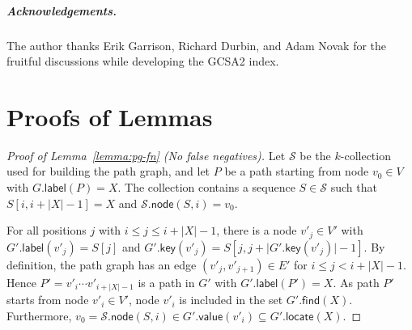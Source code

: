 \documentclass[a4paper,UKenglish]{lipics-v2016}
\newcommand{\abs}[1]{\ensuremath{\lvert #1 \rvert}}
\newcommand{\find}{\ensuremath{\mathsf{find}}}
\newcommand{\locate}{\ensuremath{\mathsf{locate}}}
\newcommand{\glabel}{\ensuremath{\mathsf{label}}}
\newcommand{\gkey}{\ensuremath{\mathsf{key}}}
\newcommand{\gvalue}{\ensuremath{\mathsf{value}}}
\newcommand{\gnode}{\ensuremath{\mathsf{node}}}
\newcommand{\kcollection}[1]{$#1$\nobreakdash-collection}
\begin{document}
\subparagraph*{Acknowledgements.}

The author thanks Erik Garrison, Richard Durbin, and Adam Novak for the fruitful discussions while developing the GCSA2 index.





\clearpage
\appendix
\section{Proofs of Lemmas}\label{appendix:proofs}

\begin{proof}[Proof of Lemma~\ref{lemma:pg-fn} (No false negatives)]
Let $\mathcal{S}$ be the \kcollection{k} used for building the path graph, and let $P$ be a path starting from node $v_{0} \in V$ with $G.\glabel(P) = X$. The collection contains a sequence $S \in \mathcal{S}$ such that $S[i, i+\abs{X}-1] = X$ and $\mathcal{S}.\gnode(S, i) = v_{0}$.

For all positions $j$ with $i \le j \le i+\abs{X}-1$, there is a node $v'_{j} \in V'$ with $G'.\glabel(v'_{j}) = S[j]$ and $G'.\gkey(v'_{j}) = S[j, j+\abs{G'.\gkey(v'_{j})}-1]$.
By definition, the path graph has an edge $(v'_{j}, v'_{j+1}) \in E'$ for $i \le j < i+\abs{X}-1$.
Hence $P' = v'_{i} \dotsm v'_{i+\abs{X}-1}$ is a path in $G'$ with $G'.\glabel(P') = X$.
As path $P'$ starts from node $v'_{i} \in V'$, node $v'_{i}$ is included in the set $G'.\find(X)$.
Furthermore, $v_{0} = \mathcal{S}.\gnode(S, i) \in G'.\gvalue(v'_{i}) \subseteq G'.\locate(X)$.
\end{proof}
\end{document}
